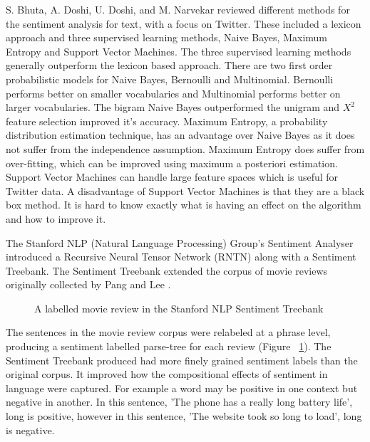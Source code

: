 S. Bhuta, A. Doshi, U. Doshi, and M. Narvekar \cite{Bhuta2014} reviewed different methods for the sentiment analysis for text, with a focus on Twitter. These included a lexicon approach and three supervised learning methods, Naive Bayes, Maximum Entropy and Support Vector Machines. The three supervised learning methods generally outperform the lexicon based approach. There are two first order probabilistic models for Naive Bayes, Bernoulli and Multinomial. Bernoulli performs better on smaller vocabularies and Multinomial performs better on larger vocabularies. The bigram Naive Bayes outperformed the unigram and ${X}^2$ feature selection improved it's accuracy. Maximum Entropy, a probability distribution estimation technique, has an advantage over Naive Bayes as it does not suffer from the independence assumption. Maximum Entropy does suffer from over-fitting, which can be improved using maximum a posteriori estimation. Support Vector Machines can handle large feature spaces which is useful for Twitter data. A disadvantage of Support Vector Machines is that they are a black box method. It is hard to know exactly what is having an effect on the algorithm and how to improve it.

The Stanford NLP (Natural Language Processing) Group's Sentiment Analyser \cite{stanfordSentiment2013} introduced a Recursive Neural Tensor Network (RNTN) along with a Sentiment Treebank. The Sentiment Treebank extended the corpus of movie reviews originally collected by Pang and Lee \cite{panglee2004}.
\begin{figure}
    \centering
    \setlength{\fboxsep}{0pt}
    \setlength{\fboxrule}{0.01pt}
    \setlength{\belowcaptionskip}{-10pt}
    \caption{A labelled movie review in the Stanford NLP Sentiment Treebank \cite{stanfordSentiment2013}}
    \label{fig:treebank}
\end{figure}
The sentences in the movie review corpus were relabeled at a phrase level, producing a sentiment labelled parse-tree for each review (Figure ~\ref{fig:treebank}). The Sentiment Treebank produced had more finely grained sentiment labels than the original corpus. It improved how the compositional effects of sentiment in language were captured. For example a word may be positive in one context but negative in another. In this sentence, 'The phone has a really long battery life', long is positive, however in this sentence, 'The website took so long to load', long is negative.

